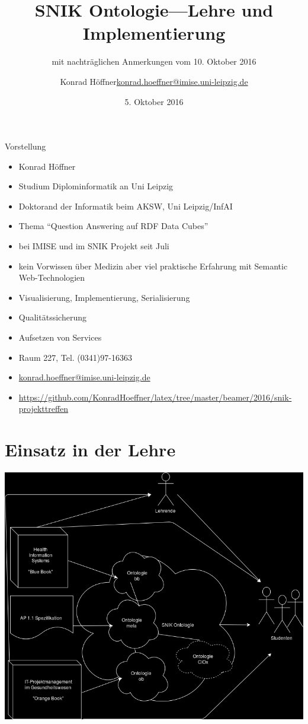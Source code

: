 \documentclass[14pt,aspectratio=1610]{beamer}
\date{5. Oktober 2016}
\author{\texorpdfstring{Konrad Höffner\newline\url{konrad.hoeffner@imise.uni-leipzig.de}}{Konrad Höffner}}
\title{SNIK Ontologie---Lehre und Implementierung}
\subtitle{mit nachträglichen Anmerkungen vom 10. Oktober 2016}
\begin{document}
\begin{frame}
\titlepage
\end{frame}

\begin{frame}{Vorstellung}
{
\begin{itemize}
\item Konrad Höffner
\item Studium Diplominformatik an Uni Leipzig
\item Doktorand der Informatik beim AKSW, Uni Leipzig/InfAI
\item Thema \enquote{Question Answering auf RDF Data Cubes}
\item bei IMISE und im SNIK Projekt seit Juli
\item kein Vorwissen über Medizin aber viel praktische Erfahrung mit Semantic Web-Technologien
\end{itemize}
}
{
\begin{itemize}
\item Visualisierung, Implementierung, Serialisierung
\item Qualitätssicherung
\item Aufsetzen von Services
\vspace{1em}
\item Raum 227, Tel. (0341)97-16363
\item \href{mailto://konrad.hoeffner@imise.uni-leipzig.de}{konrad.hoeffner@imise.uni-leipzig.de}
\item \url{https://github.com/KonradHoeffner/latex/tree/master/beamer/2016/snik-projekttreffen}
\end{itemize}
}
\end{frame}

\section{Einsatz in der Lehre}

\begin{frame}{}
\includegraphics[width=\textwidth,height=0.9\textheight,keepaspectratio]{img/lehre.png}
\end{frame}
\end{document}
